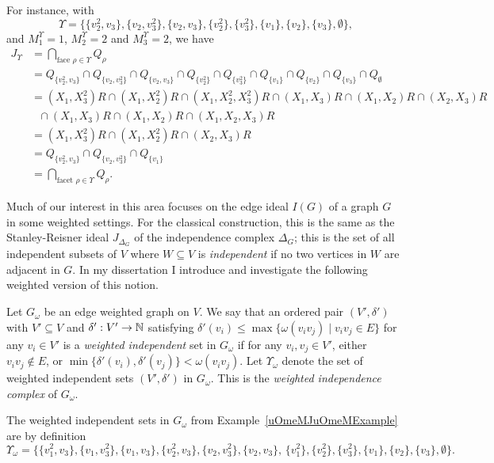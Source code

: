 \documentclass{article}
\begin{document}
For instance, with 
\[\Upsilon = \{\{v_2^2,v_3\},\{v_2,v_3^2\},\{v_2,v_3\},\{v_2^2\},\{v_3^2\},\{v_1\},\{v_2\},\{v_3\},\emptyset\},\]
and $M_1^{\Upsilon} = 1$, $M_2^{\Upsilon} = 2$ and $M_3^{\Upsilon} = 2$, we have 
\begin{align*}
    J_{\Upsilon} &= \bigcap_{\text{face }\rho \in \Upsilon}Q_\rho  \\
    &= Q_{\{v_2^2,v_3\}} \cap Q_{\{v_2,v_3^2\}} \cap Q_{\{v_2,v_3\}} \cap Q_{\{v_2^2\}} \cap Q_{\{v_3^2\}} \cap Q_{\{v_1\}} \cap Q_{\{v_2\}} \cap Q_{\{v_3\}} \cap Q_{\emptyset} \\
    &= (X_1,X_3^2)R \cap (X_1,X_2^2)R \cap (X_1,X_2^2,X_3^2)R \cap (X_1,X_3)R \cap (X_1,X_2)R \cap (X_2,X_3)R \\
    & \ \ \ \cap (X_1,X_3)R \cap (X_1,X_2)R \cap (X_1,X_2,X_3)R \\
    &= (X_1,X_3^2)R \cap (X_1,X_2^2)R \cap (X_2,X_3)R \\
    &= Q_{\{v_2^2,v_3\}} \cap Q_{\{v_2,v_3^2\}} \cap Q_{\{v_1\}} \\
    &= \bigcap_{\text{facet }\rho \in \Upsilon}Q_\rho.
\end{align*}

Much of our interest in this area focuses on the edge ideal $I(G)$ of a graph $G$~\cite{MR3822066} in some weighted settings. For the classical construction, this is the same as the Stanley-Reisner ideal $J_{\Delta_G}$ of the independence complex $\Delta_G$; this is the set of all independent subsets of $V$ where $W \subseteq V$ is \emph{independent} if no two vertices in $W$ are adjacent in $G$. In my dissertation I introduce and investigate the following weighted version of this notion. \par
    Let $G_\omega$ be an edge weighted graph on $V$. We say that an ordered pair $(V',\delta')$ with $V' \subseteq V$ and $\delta': V' \to \mathbb{N}$ satisfying $\delta'(v_i) \leq \max\{\omega(v_iv_j) \mid v_iv_j \in E\}$ for any $v_i \in V'$ is a \emph{weighted independent} set in $G_\omega$ if for any $v_i,v_j \in V'$, either $v_iv_j \not \in E$, or $\min\{\delta'(v_i),\delta'(v_j)\} < \omega(v_iv_j)$. Let $\Upsilon_\omega$ denote the set of weighted independent sets $(V',\delta')$ in $G_\omega$. This is the \emph{weighted independence complex} of $G_\omega$. \par
    The weighted independent sets in $G_\omega$ from Example~\ref{uOmeMJuOmeMExample} are by definition
    \[\Upsilon_\omega = \{\{v_1^2,v_3\},\{v_1,v_3^2\},\{v_1,v_3\},\{v_2^2,v_3\},\{v_2,v_3^2\},\{v_2,v_3\},\,\{v_1^2\},\{v_2^2\},\{v_3^2\},\{v_1\},\{v_2\},\{v_3\},\emptyset\}.\]
\end{document}
